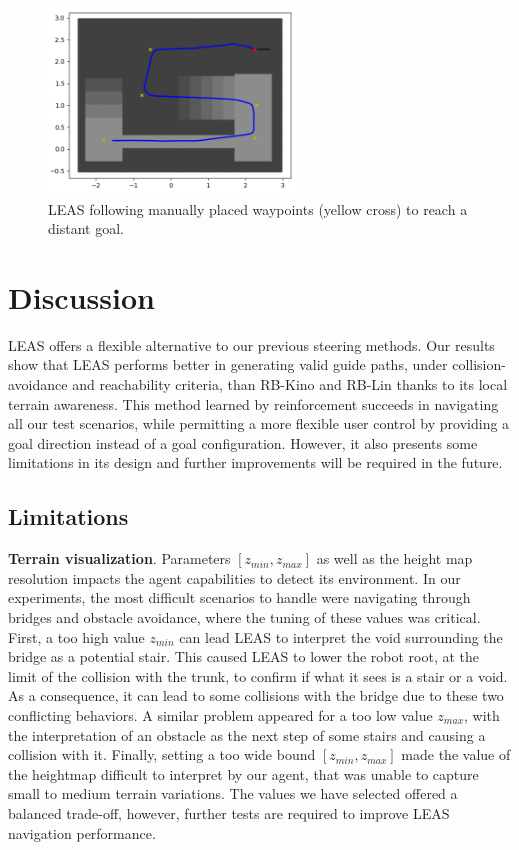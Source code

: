 \begin{figure}[t]
    \centering
    \includegraphics[width=0.6\textwidth, height=5cm]{Figures/Chapter_LEAS/follow_waypoints_bauzil.png}
    \caption{LEAS following manually placed waypoints (yellow cross) to reach a distant goal.}
    \label{fig:bauzil_waypoints}
\end{figure}




\section{Discussion\label{sub:leas:discussion}}
LEAS offers a flexible alternative to our previous steering methods. Our results show that LEAS performs better in generating valid guide paths, under collision-avoidance and reachability criteria, than RB-Kino and RB-Lin thanks to its local terrain awareness. 
This method learned by reinforcement succeeds in navigating all our test scenarios, while permitting a more flexible user control by providing a goal direction instead of a goal configuration. 
However, it also presents some limitations in its design and further improvements will be required in the future.

\subsection{Limitations}
\noindent\textbf{Terrain visualization}.
Parameters $[z_{min}, z_{max}]$ as well as the height map resolution impacts the agent capabilities to detect its environment.
In our experiments, the most difficult scenarios to handle were navigating through bridges and obstacle avoidance, where the tuning of these values was critical.
First, a too high value $z_{min}$ can lead LEAS to interpret the void surrounding the bridge as a potential stair.
This caused LEAS to lower the robot root, at the limit of the collision with the trunk, to confirm if what it sees is a stair or a void. 
As a consequence, it can lead to some collisions with the bridge due to these two conflicting behaviors.
A similar problem appeared for a too low value $z_{max}$, with the interpretation of an obstacle as the next step of some stairs and causing a collision with it.
Finally, setting a too wide bound $[z_{min}, z_{max}]$ made the value of the heightmap difficult to interpret by our agent, that was unable to capture small to medium terrain variations.
The values we have selected offered a balanced trade-off, however, further tests are required to improve LEAS navigation performance.

